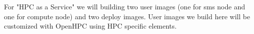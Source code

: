 For "HPC as a Service" we will building two user images (one for sms node and one for compute node) and two deploy images. User images we build here will be customized with OpenHPC using HPC specific elements. 